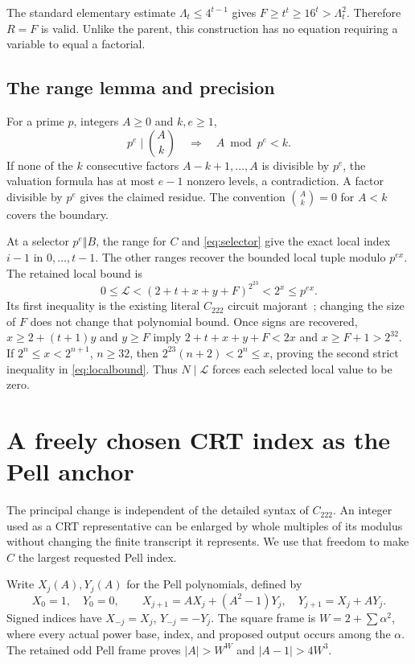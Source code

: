 \documentclass[11pt]{article}
\theoremstyle{definition}\newtheorem{remark}[theorem]{Remark}
\newcommand{\LL}{\mathcal L}
\begin{document}
The standard elementary estimate $\Lambda_t\le4^{t-1}$ gives
$F\ge t^t\ge16^t>\Lambda_t^2$. Therefore $R=F$ is valid. Unlike
the parent, this construction has no equation requiring a variable to
equal a factorial.

\subsection{The range lemma and precision}

For a prime $p$, integers $A\ge0$ and $k,e\ge1$,
\begin{equation}\label{eq:rangelemma}
 p^e\mid\binom{A}{k}\quad\Longrightarrow\quad A\bmod p^e<k.
\end{equation}
If none of the $k$ consecutive factors $A-k+1,\ldots,A$ is divisible
by $p^e$, the valuation formula has at most $e-1$ nonzero levels, a
contradiction. A factor divisible by $p^e$ gives the claimed residue.
The convention $\binom{A}{k}=0$ for $A<k$ covers the boundary.

At a selector $p^e\Vert B$, the range for $C$ and
\eqref{eq:selector} give the exact local index $i-1$ in $0,\ldots,t-1$.
The other ranges recover the bounded local tuple modulo $p^{ex}$.
The retained local bound is
\begin{equation}\label{eq:localbound}
 0\le\LL<(2+t+x+y+F)^{2^{23}}<2^x\le p^{ex}.
\end{equation}
Its first inequality is the existing literal $C_{222}$ circuit
majorant~\cite{strictbudget}; changing the size of $F$ does not change
that polynomial bound. Once signs are recovered,
$x\ge2+(t+1)y$ and $y\ge F$ imply $2+t+x+y+F<2x$ and
$x\ge F+1>2^{32}$. If $2^n\le x<2^{n+1}$, $n\ge32$, then
$2^{23}(n+2)<2^n\le x$, proving the second strict inequality in
\eqref{eq:localbound}. Thus $N\mid\LL$ forces each selected local
value to be zero.

\section{A freely chosen CRT index as the Pell anchor}

The principal change is independent of the detailed syntax of $C_{222}$.
An integer used as a CRT representative can be enlarged by whole multiples
of its modulus without changing the finite transcript it represents.
We use that freedom to make $C$ the largest requested Pell index.

Write $X_j(A),Y_j(A)$ for the Pell polynomials, defined by
\[
 X_0=1,\quad Y_0=0,\qquad
 X_{j+1}=AX_j+(A^2-1)Y_j,\quad Y_{j+1}=X_j+AY_j.
\]
Signed indices have $X_{-j}=X_j$, $Y_{-j}=-Y_j$.
The square frame is $W=2+\sum\alpha^2$, where every actual power base,
index, and proposed output occurs among the $\alpha$. The retained odd
Pell frame proves $|A|>W^W$ and $|A-1|>4W^3$.
\end{document}
